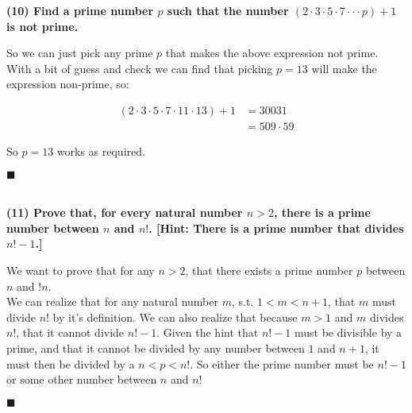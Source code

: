 \documentclass[20pt]{article}
\begin{document}
\noindent
\textbf{(10) Find a prime number $p$ such that the number $(2 \cdot 3 \cdot 5 \cdot 7 \cdot \cdot \cdot p) + 1$ is not prime.}\\
\begin{text}
    So we can just pick any prime $p$ that makes the above expression not prime.\\
    
    \noindent
    With a bit of guess and check we can find that picking $p = 13$ will make the expression non-prime, so:
    
    \begin{align}
        (2 \cdot 3 \cdot 5 \cdot 7 \cdot 11 \cdot 13) + 1 &= 30031\nonumber\\
        &= 509 \cdot 59\nonumber
    \end{align}
    
    \noindent
    So $p = 13$ works as required.
    
    \hfill $\blacksquare$
\end{text}\\

\noindent
\textbf{(11) Prove that, for every natural number $n > 2$, there is a prime number between $n$ and $n!$. [Hint: There is a prime number that divides $n! - 1$.]}\\
\begin{text}
    We want to prove that for any $n > 2$, that there exists a prime number $p$ between $n$ and $!n$.\\
    
    \noindent
    We can realize that for any natural number $m$, s.t. $1 < m < n + 1$, that $m$ must divide $n!$ by it's definition. We can also realize that because $m > 1$ and $m$ divides $n!$, that it cannot divide $n! - 1$. Given the hint that $n! - 1$ must be divisible by a prime, and that it cannot be divided by any number between $1$ and $n + 1$, it must then be divided by a $n < p < n!$. So either the prime number must be $n! - 1$ or some other number between $n$ and $n!$
    
    \hfill $\blacksquare$
\end{text}
\end{document}
